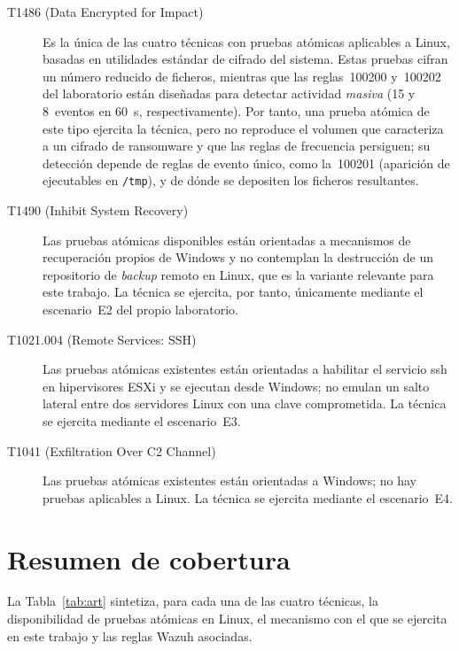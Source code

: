 \documentclass[../main.tex]{subfiles}
\begin{document}
\begin{description}
  \item[T1486 (Data Encrypted for Impact)] Es la única de las cuatro técnicas con
  pruebas atómicas aplicables a Linux, basadas en utilidades estándar de cifrado
  del sistema. Estas pruebas cifran un número reducido de ficheros, mientras que
  las reglas~100200 y~100202 del laboratorio están diseñadas para detectar
  actividad \emph{masiva} (15 y 8~eventos en 60~s, respectivamente). Por tanto, una
  prueba atómica de este tipo ejercita la técnica, pero no reproduce el volumen
  que caracteriza a un cifrado de ransomware y que las reglas de frecuencia
  persiguen; su detección depende de reglas de evento único, como la~100201
  (aparición de ejecutables en \texttt{/tmp}), y de dónde se depositen los ficheros
  resultantes.

  \item[T1490 (Inhibit System Recovery)] Las pruebas atómicas disponibles están
  orientadas a mecanismos de recuperación propios de Windows y no contemplan la
  destrucción de un repositorio de \emph{backup} remoto en Linux, que es la
  variante relevante para este trabajo. La técnica se ejercita, por tanto,
  únicamente mediante el escenario~E2 del propio laboratorio.

  \item[T1021.004 (Remote Services: SSH)] Las pruebas atómicas existentes están
  orientadas a habilitar el servicio \gls{ssh} en hipervisores ESXi y se ejecutan
  desde Windows; no emulan un salto lateral entre dos servidores Linux con una
  clave comprometida. La técnica se ejercita mediante el escenario~E3.

  \item[T1041 (Exfiltration Over C2 Channel)] Las pruebas atómicas existentes
  están orientadas a Windows; no hay pruebas aplicables a Linux. La técnica se
  ejercita mediante el escenario~E4.
\end{description}

\section{Resumen de cobertura}

La Tabla~\ref{tab:art} sintetiza, para cada una de las cuatro técnicas, la
disponibilidad de pruebas atómicas en Linux, el mecanismo con el que se
ejercita en este trabajo y las reglas Wazuh asociadas.
\end{document}
